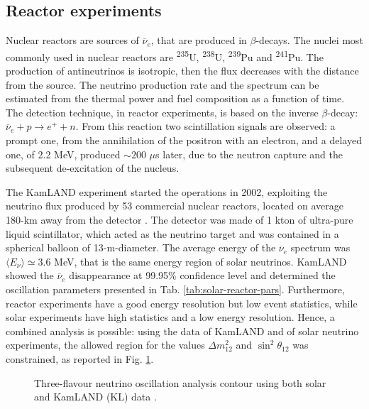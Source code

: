\subsection{Reactor experiments}
Nuclear reactors are sources of $\overline{\nu}_e$, that are produced in $\beta$-decays. The nuclei most commonly used in nuclear reactors are \textsuperscript{235}U, \textsuperscript{238}U, \textsuperscript{239}Pu and \textsuperscript{241}Pu. The production of antineutrinos is isotropic, then the flux decreases with the distance from the source. The neutrino production rate and the spectrum can be estimated from the thermal power and fuel composition as a function of time. The detection technique, in reactor experiments, is based on the inverse $\beta$-decay: $\overline{\nu}_e + p \rightarrow e^+ + n$. From this reaction two scintillation signals are observed: a prompt one, from the annihilation of the positron with an electron, and a delayed one, of 2.2 MeV, produced $\sim 200$ $\mu$s later, due to the neutron capture and the subsequent de-excitation of the nucleus.

The KamLAND experiment started the operations in 2002, exploiting the neutrino flux produced by 53 commercial nuclear reactors, located on average 180-km away from the detector \cite{KamLAND}. The detector was made of 1 kton of ultra-pure liquid scintillator, which acted as the neutrino target and was contained in a spherical balloon of 13-m-diameter. The average energy of the $\overline{\nu}_e$ spectrum was $\langle E_\nu \rangle \simeq 3.6$ MeV, that is the same energy region of solar neutrinos. KamLAND \cite{KamLAND} showed the $\overline{\nu}_e$ disappearance at 99.95\% confidence level and determined the oscillation parameters presented in Tab. \ref{tab:solar-reactor-pars}.
Furthermore, reactor experiments have a good energy resolution but low event statistics, while solar experiments have high statistics and a low energy resolution. Hence, a combined analysis is possible: using the data of KamLAND and of solar neutrino experiments, the allowed region for the values $\Delta m^2_{12}$ and $\sin^2\theta_{12}$ was constrained, as reported in Fig. \ref{fig:combined_analysis_solar}.

\begin{figure}
    \centering
    \hfil
    \caption{Three-flavour neutrino oscillation analysis contour using both solar and KamLAND (KL) data \cite{solar_reactor_combined_analysis}.}
    \label{fig:combined_analysis_solar}
\end{figure}


